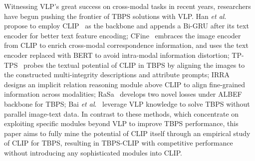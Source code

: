 \documentclass[letterpaper]{article} %
\begin{document}

Witnessing VLP's great success on cross-modal tasks in recent years, researchers~\cite{han2021text, yan2022clip, wang2023exploiting, jiang2023cross,bai2023rasa} have begun pushing the frontier of TBPS solutions with VLP.
Han \emph{et al}.~\cite{han2021text} propose to employ CLIP~\cite{radford2021learning} as the backbone and appends a Bi-GRU after its text encoder for better text feature encoding;
CFine~\cite{yan2022clip} embraces the image encoder from CLIP to enrich cross-modal correspondence information, and uses the text encoder replaced with BERT to avoid intra-modal information distortion; 
TP-TPS~\cite{wang2023exploiting} probes the textual potential of CLIP in TBPS by aligning the images to the constructed multi-integrity descriptions and attribute prompts;
IRRA~\cite{jiang2023cross} designs an implicit relation reasoning module above CLIP to align fine-grained information across modalities;
RaSa~\cite{bai2023rasa} develops two novel losses under ALBEF~\cite{li2021align} backbone for TBPS;
Bai \emph{et al}.~\cite{bai2023text} leverage VLP knowledge to solve TBPS without parallel image-text data.
In contrast to these methods, which concentrate on exploiting specific modules beyond VLP to improve TBPS performance, this paper aims to fully mine the potential of CLIP itself through an empirical study of CLIP for TBPS, resulting in TBPS-CLIP with competitive performance without introducing any sophisticated modules into CLIP.
\end{document}
